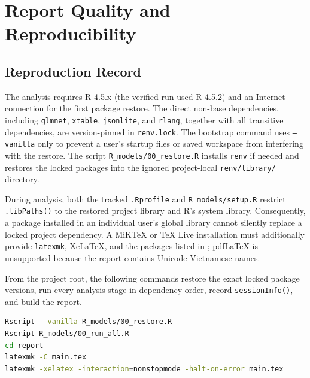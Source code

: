 \section{Report Quality and Reproducibility}
\label{sec:report-quality}

\subsection{Reproduction Record}
\label{sec:reproduction}

The analysis requires R 4.5.x (the verified run used R 4.5.2) and an Internet
connection for the first package restore.  The direct non-base dependencies,
including \texttt{glmnet}, \texttt{xtable}, \texttt{jsonlite}, and
\texttt{rlang}, together with all transitive dependencies, are version-pinned
in \texttt{renv.lock}.  The bootstrap command uses \texttt{--vanilla} only to
prevent a user's startup files or saved workspace from interfering with the
restore.  The script \texttt{R\_models/00\_restore.R} installs \texttt{renv} if
needed and restores the locked packages into the ignored project-local
\texttt{renv/library/} directory.

During analysis, both the tracked \texttt{.Rprofile} and
\texttt{R\_models/setup.R} restrict \texttt{.libPaths()} to the restored
project library and R's system library.  Consequently, a package installed in
an individual user's global library cannot silently replace a locked project
dependency.  A MiKTeX or TeX Live installation must additionally provide
\texttt{latexmk}, XeLaTeX, and the packages listed in
; pdfLaTeX is unsupported because the report
contains Unicode Vietnamese names.

From the project root, the following commands restore the exact locked package
versions, run every analysis stage in dependency order, record
\texttt{sessionInfo()}, and build the report.

\begin{lstlisting}[language=bash, caption={Exact reproduction commands.}]
Rscript --vanilla R_models/00_restore.R
Rscript R_models/00_run_all.R
cd report
latexmk -C main.tex
latexmk -xelatex -interaction=nonstopmode -halt-on-error main.tex
\end{lstlisting}

